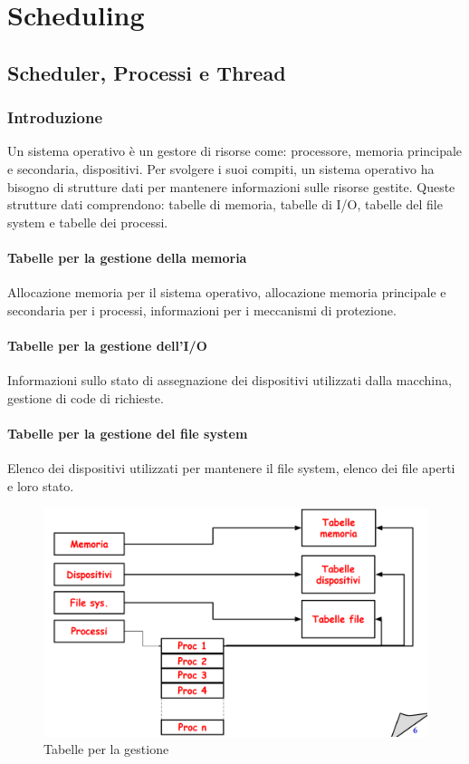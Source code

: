 \chapter{Scheduling}
\newpage

\section{Scheduler, Processi e Thread}
\subsection{Introduzione}
Un sistema operativo è un gestore di risorse come: processore, memoria principale e secondaria, dispositivi. Per svolgere i suoi compiti, un sistema operativo ha bisogno di strutture dati per mantenere informazioni sulle risorse gestite.
Queste strutture dati comprendono: tabelle di memoria, tabelle di I/O, tabelle del file system e tabelle dei processi.

\subsubsection{Tabelle per la gestione della memoria}
Allocazione memoria per il sistema operativo, 
allocazione memoria principale e secondaria per i processi,
informazioni per i meccanismi di protezione.

\subsubsection{Tabelle per la gestione dell'I/O}
Informazioni sullo stato di assegnazione dei dispositivi utilizzati dalla macchina, gestione di code di richieste.

\subsubsection{Tabelle per la gestione del file system}
Elenco dei dispositivi utilizzati per mantenere il file system, elenco dei file aperti e loro stato.

\begin{figure}[h]
    \centering
    \includegraphics[width=0.7\linewidth]{Images/Screenshot 2024-12-18 at 15-07-44 so-02.1-scheduling - so-02.1-scheduling.pdf.png}
    \caption{Tabelle per la gestione}
\end{figure}

